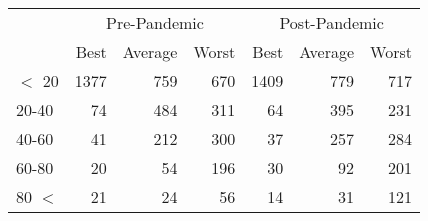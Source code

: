 
\begin{tabular}[t]{lrrrrrr}
\toprule
\multicolumn{1}{c}{ } & \multicolumn{3}{c}{Pre-Pandemic} & \multicolumn{3}{c}{Post-Pandemic} \\
\cmidrule(l{3pt}r{3pt}){2-4} \cmidrule(l{3pt}r{3pt}){5-7}
 & Best & Average & Worst & Best & Average & Worst\\
\midrule
$<$ 20 & 1377 & 759 & 670 & 1409 & 779 & 717\\
20-40 & 74 & 484 & 311 & 64 & 395 & 231\\
40-60 & 41 & 212 & 300 & 37 & 257 & 284\\
60-80 & 20 & 54 & 196 & 30 & 92 & 201\\
80 $<$ & 21 & 24 & 56 & 14 & 31 & 121\\
\bottomrule
\end{tabular}
